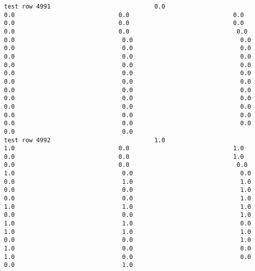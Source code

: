 \documentclass[11pt]{article}
\begin{document}
\begin{verbatim}
test row 4991                             0.0                             0.0                             0.0                             0.0                             0.0                             0.0                             0.0                             0.0                             0.0                              0.0                              0.0                              0.0                              0.0                              0.0                              0.0                              0.0                              0.0                              0.0                              0.0                              0.0                              0.0                              0.0                              0.0                              0.0                              0.0                              0.0                              0.0                              0.0                              0.0                              0.0                              0.0                              0.0                              0.0                              0.0                              0.0                              0.0                              0.0                              0.0                              0.0                              0.0                              0.0                              0.0                              0.0                              0.0                              0.0
test row 4992                             1.0                             1.0                             0.0                             1.0                             0.0                             0.0                             1.0                             0.0                             0.0                              0.0                              1.0                              0.0                              0.0                              0.0                              1.0                              1.0                              0.0                              0.0                              1.0                              0.0                              0.0                              1.0                              1.0                              1.0                              1.0                              0.0                              0.0                              1.0                              1.0                              1.0                              0.0                              1.0                              1.0                              1.0                              0.0                              0.0                              1.0                              1.0                              0.0                              0.0                              1.0                              0.0                              0.0                              0.0                              1.0

\end{verbatim}
\end{document}
